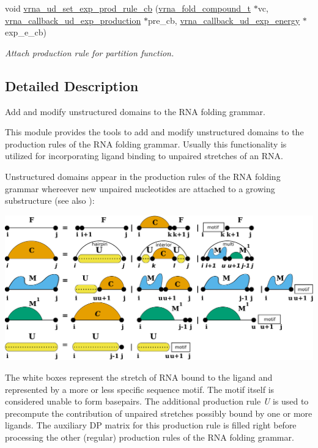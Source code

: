 \begin{DoxyCompactItemize}
void \hyperlink{group__domains__up_ga2fb1db2099da26c76247e1209ad4aa09}{vrna\+\_\+ud\+\_\+set\+\_\+exp\+\_\+prod\+\_\+rule\+\_\+cb} (\hyperlink{group__fold__compound_ga1b0cef17fd40466cef5968eaeeff6166}{vrna\+\_\+fold\+\_\+compound\+\_\+t} $\ast$vc, \hyperlink{group__domains__up_ga33d78327dcd04c1ca5ab2887edc18c7b}{vrna\+\_\+callback\+\_\+ud\+\_\+exp\+\_\+production} $\ast$pre\+\_\+cb, \hyperlink{group__domains__up_ga861706f257ba993753464b823e65b86e}{vrna\+\_\+callback\+\_\+ud\+\_\+exp\+\_\+energy} $\ast$exp\+\_\+e\+\_\+cb)
\begin{DoxyCompactList}\small\item\em Attach production rule for partition function. \end{DoxyCompactList}\end{DoxyCompactItemize}


\subsection{Detailed Description}
Add and modify unstructured domains to the R\+NA folding grammar. 

This module provides the tools to add and modify unstructured domains to the production rules of the R\+NA folding grammar. Usually this functionality is utilized for incorporating ligand binding to unpaired stretches of an R\+NA.

Unstructured domains appear in the production rules of the R\+NA folding grammar whereever new unpaired nucleotides are attached to a growing substructure (see also \cite{lorenz:2016b})\+:  
\begin{DoxyImageNoCaption}
  \mbox{\includegraphics[width=\textwidth,height=\textheight/2,keepaspectratio=true]{Crecursion}}
\end{DoxyImageNoCaption}


The white boxes represent the stretch of R\+NA bound to the ligand and represented by a more or less specific sequence motif. The motif itself is considered unable to form basepairs. The additional production rule {\itshape U} is used to precompute the contribution of unpaired stretches possibly bound by one or more ligands. The auxiliary DP matrix for this production rule is filled right before processing the other (regular) production rules of the R\+NA folding grammar.

